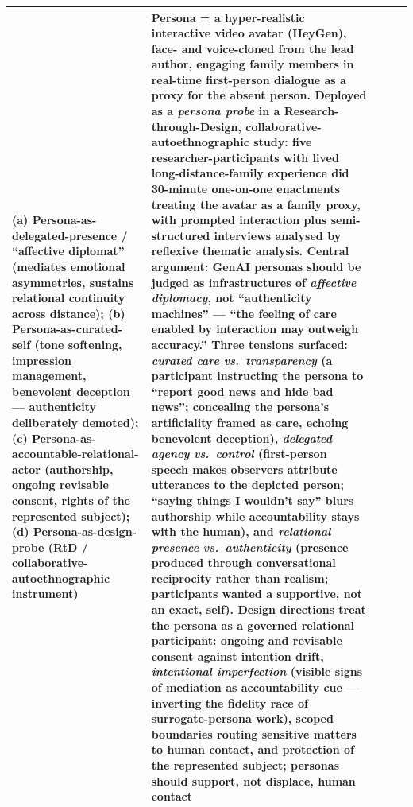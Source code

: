 \begin{table}[t]
\begin{tabular}{p{0.5cm} p{3.6cm} p{3.4cm} p{3.6cm} p{3.6cm}}
(a) Persona-as-delegated-presence / ``affective diplomat'' (mediates emotional asymmetries, sustains relational continuity across distance); (b) Persona-as-curated-self (tone softening, impression management, benevolent deception --- authenticity deliberately demoted); (c) Persona-as-accountable-relational-actor (authorship, ongoing revisable consent, rights of the represented subject); (d) Persona-as-design-probe (RtD / collaborative-autoethnographic instrument) &
Persona = a hyper-realistic interactive video avatar (HeyGen), face- and voice-cloned from the lead author, engaging family members in real-time first-person dialogue as a proxy for the absent person. Deployed as a \emph{persona probe} in a Research-through-Design, collaborative-autoethnographic study: five researcher-participants with lived long-distance-family experience did 30-minute one-on-one enactments treating the avatar as a family proxy, with prompted interaction plus semi-structured interviews analysed by reflexive thematic analysis. Central argument: GenAI personas should be judged as infrastructures of \emph{affective diplomacy}, not ``authenticity machines'' --- ``the feeling of care enabled by interaction may outweigh accuracy.'' Three tensions surfaced: \emph{curated care vs.\ transparency} (a participant instructing the persona to ``report good news and hide bad news''; concealing the persona's artificiality framed as care, echoing benevolent deception), \emph{delegated agency vs.\ control} (first-person speech makes observers attribute utterances to the depicted person; ``saying things I wouldn't say'' blurs authorship while accountability stays with the human), and \emph{relational presence vs.\ authenticity} (presence produced through conversational reciprocity rather than realism; participants wanted a supportive, not an exact, self). Design directions treat the persona as a governed relational participant: ongoing and revisable consent against intention drift, \emph{intentional imperfection} (visible signs of mediation as accountability cue --- inverting the fidelity race of surrogate-persona work), scoped boundaries routing sensitive matters to human contact, and protection of the represented subject; personas should support, not displace, human contact \\
\bottomrule
\end{tabular}
\end{table}
